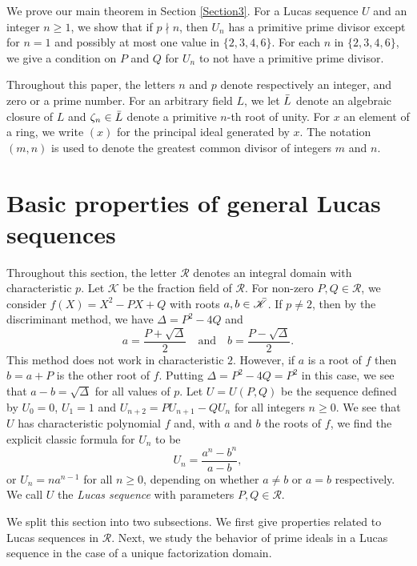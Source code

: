 \documentclass[reqno]{amsart}
\begin{document}
We prove our main theorem in Section \ref{Section3}. For a Lucas sequence $U$ and an integer $n\geq 1$, we show that if $p\nmid n$, then $U_n$ has a primitive prime divisor except for $n=1$ and possibly at most one value in $\{2,3,4,6\}$. For each $n$ in $\{2,3,4,6\}$, we give a condition on $P$ and $Q$ for $U_n$ to not have a primitive prime divisor.


Throughout this paper, the letters $n$ and $p$ denote respectively an integer, and zero or a prime number. For an arbitrary field $L$, we let $\Bar{L}$ denote an algebraic closure of $L$ and $\zeta_n \in \Bar{L}$ denote a primitive $n$-th root of unity. For $x$ an element of a ring, we write $(x)$ for the principal ideal generated by $x$. The notation $(m,n)$ is used to denote the greatest common divisor of integers $m$ and $n$.








\section{Basic properties of general Lucas sequences}\label{Section2}

Throughout this section, the letter $\mathscr{R}$ denotes an integral domain with characteristic $p$. Let $\mathscr{K}$ be the fraction field of $\mathscr{R}$. For non-zero $P,Q\in \mathscr{R}$, we consider $f(X)= X^2-PX+Q$ with roots $a,b\in \Bar{\mathscr{K}}$. If $p\ne 2$, then by the discriminant method, we have $\Delta=P^2-4Q$ and 
\[
a=\frac{P+\sqrt{\Delta}}{2} \quad \text{and} \quad b=\frac{P-\sqrt{\Delta}}{2}.
\]
This method does not work in characteristic $2$. However, if $a$ is a root of $f$ then $b=a+P$ is the other root of $f$. Putting $\Delta=P^2-4Q=P^2$ in this case, we see that $a-b=\sqrt{\Delta}$ for all values of $p$. Let $U=U(P,Q)$ be the sequence defined by $U_0=0$, $U_1=1$ and $U_{n+2}=PU_{n+1}-QU_n$ for all integers $n\geq 0$. We see that $U$ has characteristic polynomial $f$ and, with $a$ and $b$ the roots of $f$, we find the explicit classic formula for $U_n$ to be
\[
U_n=\frac{a^n-b^n}{a-b},
\]
or $U_n=na^{n-1}$ for all $n\geq 0$, depending on whether $a\ne b$ or $a=b$ respectively. We call $U$ the {\it Lucas sequence} with parameters $P,Q\in \mathscr{R}$. 

We split this section into two subsections. We first give properties related to Lucas sequences in $\mathscr{R}$. Next, we study the behavior of prime ideals in a Lucas sequence in the case of a unique factorization domain.
\end{document}
